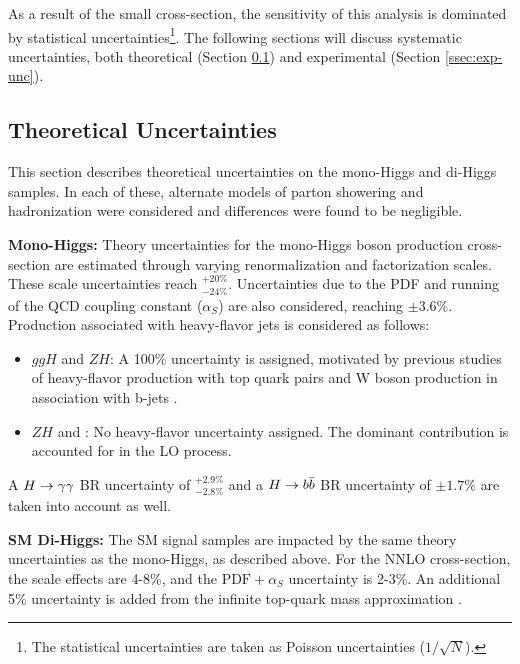 As a result of the small \hh cross-section, the sensitivity of this analysis is dominated by statistical uncertainties\footnote{The statistical uncertainties are taken as Poisson uncertainties ($1/\sqrt{N}$).}. The following sections will discuss systematic uncertainties, both theoretical (Section \ref{ssec:theory-unc}) and experimental (Section \ref{ssec:exp-unc}).

\subsection{Theoretical Uncertainties} \label{ssec:theory-unc}

This section describes theoretical uncertainties on the mono-Higgs and di-Higgs samples. In each of these, alternate models of parton showering and hadronization were considered and differences were found to be negligible.

\noindent\textbf{Mono-Higgs:} Theory uncertainties for the mono-Higgs boson production cross-section are estimated through varying renormalization and factorization scales. These scale uncertainties reach $^{+20\%}_{-24\%}$. Uncertainties due to the \gls{PDF} and running of the \gls{QCD} coupling constant ($\alpha_{S}$) are also considered, reaching $\pm3.6\%$. Production associated with heavy-flavor jets is considered as follows:

\begin{itemize}
  \item $ggH$ and $ZH$: A 100\% uncertainty is assigned, motivated by previous studies of heavy-flavor production with top quark pairs \cite{heavy-flavor-top} and W boson production in association with b-jets \cite{heavy-flavor-W}.
  \item $ZH$ and \tth: No heavy-flavor uncertainty assigned. The dominant contribution is accounted for in the \gls{LO} process.
\end{itemize}

A $H\rightarrow \gamma\gamma$ \gls{BR} uncertainty of $^{+2.9\%}_{-2.8\%}$ and a $H\rightarrow b\bar{b}$ \gls{BR} uncertainty of $\pm1.7\%$ \cite{hh-crosssections} are taken into account as well.

\noindent\textbf{\gls{SM} Di-Higgs:} The \gls{SM} \hh signal samples are impacted by the same theory uncertainties as the mono-Higgs, as described above. For the \gls{NNLO} cross-section, the scale effects are 4-8\%, and the $\text{PDF}+\alpha_{S}$ uncertainty is 2-3\%. An additional 5\% uncertainty is added from the infinite top-quark mass approximation \cite{nnlo-topquark}.

